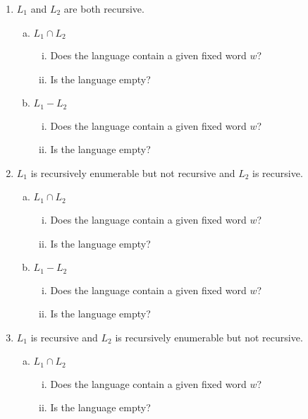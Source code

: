 \begin{enumerate}[1.]
    \item \(L_1\) and \(L_2\) are both recursive.
    \begin{enumerate}[a.]
        \item \(L_1 \cap L_2\)
        \begin{enumerate}[i.]
            \item Does the language contain a given fixed word \(w\)?
            \item Is the language empty?
        \end{enumerate}
        \item \(L_1 - L_2\)
        \begin{enumerate}[i.]
            \item Does the language contain a given fixed word \(w\)?
            \item Is the language empty?
        \end{enumerate}
    \end{enumerate}
    \item \(L_1\) is recursively enumerable but not recursive and \(L_2\) is recursive.
    \begin{enumerate}[a.]
        \item \(L_1 \cap L_2\)
        \begin{enumerate}[i.]
            \item Does the language contain a given fixed word \(w\)?
            \item Is the language empty?
        \end{enumerate}
        \item \(L_1 - L_2\)
        \begin{enumerate}[i.]
            \item Does the language contain a given fixed word \(w\)?
            \item Is the language empty?
        \end{enumerate}
    \end{enumerate}
    \item \(L_1\) is recursive and \(L_2\) is recursively enumerable but not recursive.
    \begin{enumerate}[a.]
        \item \(L_1 \cap L_2\)
        \begin{enumerate}[i.]
            \item Does the language contain a given fixed word \(w\)?
            \item Is the language empty?

\end{enumerate}
\end{enumerate}
\end{enumerate}
